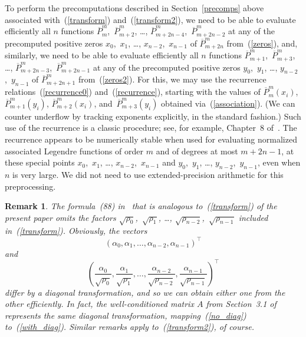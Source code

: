 \documentclass[final,3p,times]{elsarticle}
\newtheorem{remark1}[theorem]{Remark}
\newenvironment{remark}{\begin{remark1}\rm}{\end{remark1}}
\begin{document}
To perform the precomputations described in Section~\ref{precomps} above
associated with~(\ref{transform}) and~(\ref{transform2}),
we need to be able to evaluate efficiently all $n$ functions
$\overline{P}^m_m$,~$\overline{P}^m_{m+2}$, \dots,
$\overline{P}^m_{m+2n-4}$,~$\overline{P}^m_{m+2n-2}$
at any of the precomputed positive zeros
$x_0$,~$x_1$, \dots, $x_{n-2}$,~$x_{n-1}$ 
of $\overline{P}^m_{m+2n}$ from~(\ref{zeros}),
and, similarly, we need to be able to evaluate efficiently all $n$ functions
$\overline{P}^m_{m+1}$,~$\overline{P}^m_{m+3}$, \dots,
$\overline{P}^m_{m+2n-3}$,~$\overline{P}^m_{m+2n-1}$
at any of the precomputed positive zeros
$y_0$,~$y_1$, \dots, $y_{n-2}$,~$y_{n-1}$ 
of $\overline{P}^m_{m+2n+1}$ from~(\ref{zeros2}).
For this, we may use the recurrence relations~(\ref{recurrence0})
and~(\ref{recurrence}), starting with the values of $\overline{P}^m_m(x_i)$,
$\overline{P}^m_{m+1}(y_i)$, $\overline{P}^m_{m+2}(x_i)$,
and~$\overline{P}^m_{m+3}(y_i)$ obtained via~(\ref{association}).
(We can counter underflow by tracking exponents explicitly,
in the standard fashion.)
Such use of the recurrence is a classic procedure;
see, for example, Chapter~8 of~\cite{abramowitz-stegun}.
The recurrence appears to be numerically stable when used
for evaluating normalized associated Legendre functions of order $m$
and of degrees at most $m+2n-1$,
at these special points $x_0$,~$x_1$, \dots, $x_{n-2}$,~$x_{n-1}$ 
and $y_0$,~$y_1$, \dots, $y_{n-2}$,~$y_{n-1}$, even when $n$ is very large.
We did not need to use extended-precision arithmetic for this preprocessing.

\begin{remark}
\label{omission}
The formula~(88) in~\cite{tygert_sph} that is analogous to~(\ref{transform})
of the present paper omits the factors $\sqrt{\rho_0}$,~$\sqrt{\rho_1}$, \dots,
$\sqrt{\rho_{n-2}}$,~$\sqrt{\rho_{n-1}}$ included in~(\ref{transform}).
Obviously, the vectors
\begin{equation}
\label{no_diag}
(\alpha_0, \alpha_1, \dots, \alpha_{n-2}, \alpha_{n-1})^\top
\end{equation}
and
\begin{equation}
\label{with_diag}
\left(\frac{\alpha_0}{\sqrt{\rho_0}}, \frac{\alpha_1}{\sqrt{\rho_1}}, \dots,
\frac{\alpha_{n-2}}{\sqrt{\rho_{n-2}}}, \frac{\alpha_{n-1}}{\sqrt{\rho_{n-1}}}
\right)^\top
\end{equation}
differ by a diagonal transformation, and so we can obtain either one
from the other efficiently.
In fact, the well-conditioned matrix $A$ from Section~3.1 of~\cite{tygert_sph}
represents the same diagonal transformation,
mapping~(\ref{no_diag}) to~(\ref{with_diag}).
Similar remarks apply to~(\ref{transform2}), of course.
\end{remark}
\end{document}
